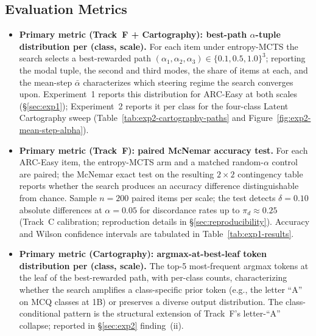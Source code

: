 \documentclass{article}
\begin{document}
\subsection{Evaluation Metrics}

\begin{itemize}[leftmargin=*]
    \item \textbf{Primary metric (Track~F + Cartography): best-path $\alpha$-tuple distribution per (class, scale).} For each item under entropy-MCTS the search selects a best-rewarded path $(\alpha_1, \alpha_2, \alpha_3) \in \{0.1, 0.5, 1.0\}^3$; reporting the modal tuple, the second and third modes, the share of items at each, and the mean-step $\bar{\alpha}$ characterizes which steering regime the search converges upon. Experiment~1 reports this distribution for ARC-Easy at both scales (§\ref{sec:exp1}); Experiment~2 reports it per class for the four-class Latent Cartography sweep (Table~\ref{tab:exp2-cartography-paths} and Figure~\ref{fig:exp2-mean-step-alpha}).
    \item \textbf{Primary metric (Track~F): paired McNemar accuracy test.} For each ARC-Easy item, the entropy-MCTS arm and a matched random-$\alpha$ control are paired; the McNemar exact test on the resulting $2 \times 2$ contingency table reports whether the search produces an accuracy difference distinguishable from chance. Sample $n = 200$ paired items per scale; the test detects $\delta = 0.10$ absolute differences at $\alpha = 0.05$ for discordance rates up to $\pi_d \approx 0.25$ (Track~C calibration; reproduction details in §\ref{sec:reproducibility}). Accuracy and Wilson confidence intervals are tabulated in Table~\ref{tab:exp1-results}.
    \item \textbf{Primary metric (Cartography): argmax-at-best-leaf token distribution per (class, scale).} The top-5 most-frequent argmax tokens at the leaf of the best-rewarded path, with per-class counts, characterizing whether the search amplifies a class-specific prior token (e.g., the letter ``A'' on MCQ classes at 1B) or preserves a diverse output distribution. The class-conditional pattern is the structural extension of Track~F's letter-``A'' collapse; reported in §\ref{sec:exp2} finding~(ii).

\end{itemize}
\end{document}
